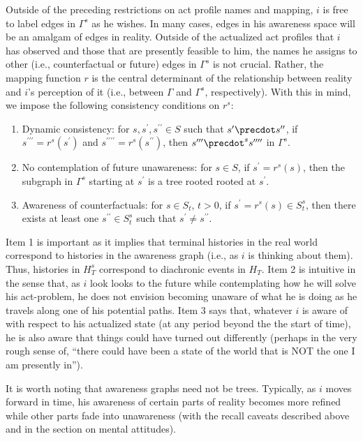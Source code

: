\documentclass[
11pt,
titlepage,
reqno,
]{article}%
\theoremstyle{definition}
\begin{document}
Outside of the preceding restrictions on act profile names and mapping, $i$ is free to label edges in $\Gamma^s$ as he wishes.
In many cases, edges in his awareness space will be an amalgam of edges in reality. 
Outside of the actualized act profiles that $i$ has observed and those that are presently feasible to him, the names he assigns to other (i.e., counterfactual or future)  edges in $\Gamma^s$ is not crucial.
Rather, the mapping function $r$ is the central determinant of the relationship between reality and $i$'s perception of it (i.e., between  $\Gamma$ and $\Gamma^s$, respectively). 
With this in mind, we impose the following consistency conditions on $r^s$:
\begin{enumerate}
	\item Dynamic consistency: for $s,s^\prime,s^{\prime\prime}\in S$ such that $s^\prime\precdot s^{\prime\prime} $, if $s^{\prime\prime\prime}=r^s(s^\prime)$ and $s^{\prime\prime\prime\prime}=r^s(s^{\prime\prime})$, then $s^{\prime\prime\prime}\precdot^s s^{\prime\prime\prime\prime}$ in $\Gamma^s$.
	\item No contemplation of future unawareness: for $s\in S$, if $s^{\prime}=r^s(s)$, then the subgraph in $\Gamma^s$ starting at $s^\prime$ is a tree rooted rooted at $s^\prime$.
	\item Awareness of counterfactuals:  for $s\in S_t$, $t>0$, if $s^{\prime}=r^s(s)\in S^s_t$, then there exists at least one $s^{\prime\prime}\in S^s_t$ such that  $s^{\prime}\ne s^{\prime\prime}$.
\end{enumerate}
Item 1 is important as it implies that terminal histories in the real world correspond to histories in the awareness graph (i.e., as $i$ is thinking about them).
Thus, histories in $H^s_T$ correspond to diachronic events in $H_T$.
Item 2 is intuitive in the sense that, as $i$ look looks to the future while contemplating how he will solve his  act-problem, he does not envision becoming unaware of what he is doing as he travels along one of his potential paths.
Item 3 says that, whatever $i$ is aware of with respect to his actualized state (at any period beyond the the start of time), he is also aware that things could have turned out differently (perhaps in the very rough sense of, ``there could have been a state of the world that is NOT the one I am presently in'').

It is worth noting that awareness graphs need not be trees. 
Typically, as $i$ moves forward in time, his awareness of certain parts of reality becomes more refined while other parts fade into unawareness (with the recall caveats described above and in the section on mental attitudes).
\end{document}
